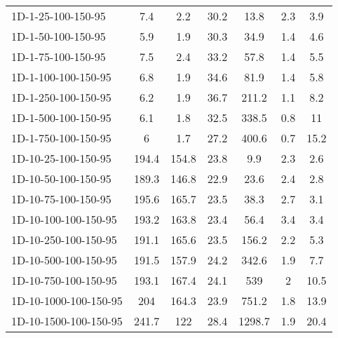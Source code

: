 \documentclass{article}
\begin{document}
\begin{table}[h]
\begin{center}
\begin{tabular}{|l||c|c|c|c|c|c|}
            \hline
            1D-1-25-100-150-95                      & 7.4     & 2.2        & 30.2       & 13.8        & 2.3       & 3.9        \\
            1D-1-50-100-150-95                      & 5.9     & 1.9        & 30.3       & 34.9        & 1.4       & 4.6        \\
            1D-1-75-100-150-95                      & 7.5     & 2.4        & 33.2       & 57.8        & 1.4       & 5.5        \\
            1D-1-100-100-150-95                     & 6.8     & 1.9        & 34.6       & 81.9        & 1.4       & 5.8        \\
            1D-1-250-100-150-95                     & 6.2     & 1.9        & 36.7       & 211.2       & 1.1       & 8.2        \\
            1D-1-500-100-150-95                     & 6.1     & 1.8        & 32.5       & 338.5       & 0.8       & 11         \\
            1D-1-750-100-150-95                     & 6       & 1.7        & 27.2       & 400.6       & 0.7       & 15.2       \\
            \hline
            1D-10-25-100-150-95                      & 194.4   & 154.8      & 23.8       & 9.9         & 2.3       & 2.6        \\
            1D-10-50-100-150-95                      & 189.3   & 146.8      & 22.9       & 23.6        & 2.4       & 2.8        \\
            1D-10-75-100-150-95                      & 195.6   & 165.7      & 23.5       & 38.3        & 2.7       & 3.1        \\
            1D-10-100-100-150-95                     & 193.2   & 163.8      & 23.4       & 56.4        & 3.4       & 3.4        \\
            1D-10-250-100-150-95                     & 191.1   & 165.6      & 23.5       & 156.2       & 2.2       & 5.3        \\
            1D-10-500-100-150-95                     & 191.5   & 157.9      & 24.2       & 342.6       & 1.9       & 7.7        \\
            1D-10-750-100-150-95                     & 193.1   & 167.4      & 24.1       & 539         & 2         & 10.5       \\
            1D-10-1000-100-150-95                    & 204     & 164.3      & 23.9       & 751.2       & 1.8       & 13.9       \\
            1D-10-1500-100-150-95                    & 241.7   & 122        & 28.4       & 1298.7      & 1.9       & 20.4       \\

\end{tabular}
\end{center}
\end{table}
\end{document}
